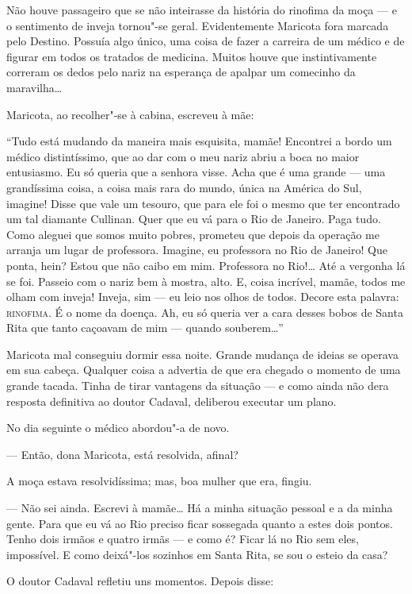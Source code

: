 Não houve passageiro que se não inteirasse da história do rinofima da
moça --- e o sentimento de inveja tornou"-se geral. Evidentemente
Maricota fora marcada pelo Destino. Possuía algo único, uma coisa de
fazer a carreira de um médico e de figurar em todos os tratados de
medicina. Muitos houve que instintivamente correram os dedos pelo nariz
na esperança de apalpar um comecinho da maravilha\ldots{}

Maricota, ao recolher"-se à cabina, escreveu à mãe:

``Tudo está mudando da maneira mais esquisita, mamãe! Encontrei a bordo
um médico distintíssimo, que ao dar com o meu nariz abriu a boca no
maior entusiasmo. Eu só queria que a senhora visse. Acha que é uma
grande --- uma grandíssima coisa, a coisa mais rara do mundo, única na
América do Sul, imagine! Disse que vale um tesouro, que para ele foi o
mesmo que ter encontrado um tal diamante Cullinan. Quer que eu vá para o
Rio de Janeiro. Paga tudo. Como aleguei que somos muito pobres, prometeu
que depois da operação me arranja um lugar de professora. Imagine, eu
professora no Rio de Janeiro! Que ponta, hein? Estou que não caibo em
mim. Professora no Rio!\ldots{} Até a vergonha lá se foi. Passeio com o nariz
bem à mostra, alto. E, coisa incrível, mamãe, todos me olham com inveja!
Inveja, sim --- eu leio nos olhos de todos. Decore esta palavra:
\textsc{rinofima}. É o nome da doença. Ah, eu só queria ver a cara desses bobos
de Santa Rita que tanto caçoavam de mim --- quando souberem\ldots{}''

Maricota mal conseguiu dormir essa noite. Grande mudança de ideias se
operava em sua cabeça. Qualquer coisa a advertia de que era chegado o
momento de uma grande tacada. Tinha de tirar vantagens da situação --- e
como ainda não dera resposta definitiva ao doutor Cadaval, deliberou
executar um plano.

No dia seguinte o médico abordou"-a de novo.

--- Então, dona Maricota, está resolvida, afinal?

A moça estava resolvidíssima; mas, boa mulher que era, fingiu.

--- Não sei ainda. Escrevi à mamãe\ldots{} Há a minha situação pessoal e a da
minha gente. Para que eu vá ao Rio preciso ficar sossegada quanto a
estes dois pontos. Tenho dois irmãos e quatro irmãs --- e como é? Ficar
lá no Rio sem eles, impossível. E como deixá"-los sozinhos em Santa Rita,
se sou o esteio da casa?

O doutor Cadaval refletiu uns momentos. Depois disse:

